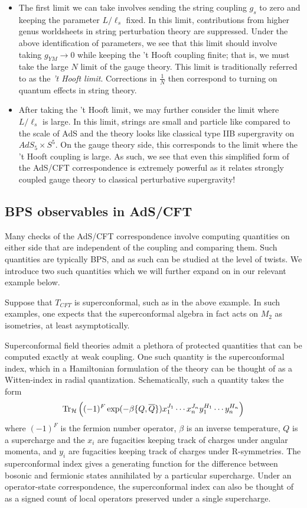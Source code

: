 \begin{itemize}
\item The first limit we can take involves sending the string coupling $g_s$ to zero and keeping the parameter $L/\ell_s$ fixed. In this limit, contributions from higher genus worldsheets in string perturbation theory are suppressed. Under the above identification of parameters, we see that this limit should involve taking $g_{YM}\to 0$ while keeping the 't Hooft coupling finite; that is, we must take the large $N$ limit of the gauge theory. This limit is traditionally referred to as the \textit{'t Hooft limit}. Corrections in $\frac{1}{N}$ then correspond to turning on quantum effects in string theory.

\item After taking the 't Hooft limit, we may further consider the limit where $L/\ell_s$ is large. In this limit, strings are small and particle like compared to the scale of AdS and the theory looks like classical type IIB supergravity on $AdS_5\times S^5$. On the gauge theory side, this corresponds to the limit where the 't Hooft coupling is large. As such, we see that even this simplified form of the AdS/CFT correspondence is extremely powerful as it relates strongly coupled gauge theory to classical perturbative supergravity!
\end{itemize}

\subsection{BPS observables in AdS/CFT}\label{bpsadscft}

Many checks of the AdS/CFT correspondence involve computing quantities on either side that are independent of the coupling and comparing them. Such quantities are typically BPS, and as such can be studied at the level of twists. We introduce two such quantities which we will further expand on in our relevant example below. 

\parsec[]
Suppose that $T_{CFT}$ is superconformal, such as in the above example. In such examples, one expects that the superconformal algebra in fact acts on $M_2$ as isometries, at least asymptotically.

Superconformal field theories admit a plethora of protected quantities that can be computed exactly at weak coupling. One such quantity is the superconformal index, which in a Hamiltonian formulation of the theory can be thought of as a Witten-index in radial quantization. Schematically, such a quantity takes the form \[\operatorname{Tr} _{\mathcal{H}} \left ( (-1)^F \exp (-\beta \{ Q, \overline Q\} ) x_1^{J_1}\cdots x_n^{J_n}y_1^{H_1}\cdots y_n^{H_n} \right )\] where $(-1)^F$ is the fermion number operator, $\beta$ is an inverse temperature, $Q$ is a supercharge and the $x_i$ are fugacities keeping track of charges under angular momenta, and $y_i$ are fugacities keeping track of charges under R-symmetries. The superconformal index gives a generating function for the difference between bosonic and fermionic states annihilated by a particular supercharge. Under an operator-state correspondence, the superconformal index can also be thought of as a signed count of local operators preserved under a single supercharge. 

